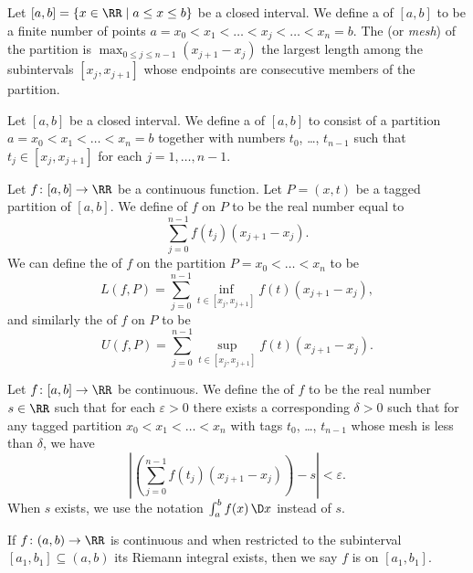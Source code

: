 \begin{node}\label{calculus:integral-0003}%

\begin{definition}\label{calculus:integral-0004}%
Let $[a,b]=\{x\in\RR\mid a\leq x\leq b\}$ be a closed interval.
We define a  of $[a,b]$ to be a finite number of
points $a=x_{0}<x_{1}<\dots<x_{j}<\dots<x_{n}=b$. The  (or
\emph{mesh}) of the partition is $\max_{0\leq j\leq n-1}(x_{j+1}-x_{j})$
the largest length among the subintervals $[x_{j}, x_{j+1}]$ whose
endpoints are consecutive members of the partition.
\end{definition}

\begin{definition}\label{calculus:integral-0005}%
Let $[a,b]$ be a closed interval.
We define a  of $[a,b]$ to consist of a
partition $a=x_{0}<x_{1}<\dots<x_{n}=b$ together with numbers $t_{0}$,
\dots, $t_{n-1}$ such that $t_{j}\in[x_{j},x_{j+1}]$ for each $j=1,\dots,n-1$.
\end{definition}

\begin{definition}\label{calculus:integral-0002}%
Let $f\colon[a,b]\to\RR$ be a continuous function. Let
$P=(x, t)$ be a tagged partition of $[a,b]$. We define 
 of $f$ on $P$ to be the real number equal to
\[\sum^{n-1}_{j=0}f(t_{j})(x_{j+1}-x_{j}).\]
We can define the  of $f$ on the partition
$P=x_{0}<\dots<x_{n}$ to be
\[L(f,P) =\sum^{n-1}_{j=0}\inf_{t\in[x_{j},x_{j+1}]}f(t)(x_{j+1}-x_{j}),\]
and similarly the  of $f$ on $P$ to be
\[U(f,P) =\sum^{n-1}_{j=0}\sup_{t\in[x_{j},x_{j+1}]}f(t)(x_{j+1}-x_{j}).\]
\end{definition}

\begin{definition}\label{calculus:integral-0006}%
Let $f\colon[a,b]\to\RR$ be continuous. We define the 
of $f$ to be the real number $s\in\RR$ such that for each
$\varepsilon>0$ there exists a corresponding $\delta>0$ such that for
any tagged partition $x_{0}<x_{1}<\dots<x_{n}$ with tags $t_{0}$, \dots, $t_{n-1}$
whose mesh is less than $\delta$, we have
\[\left|\left(\sum^{n-1}_{j=0}f(t_{j})(x_{j+1}-x_{j})\right)-s\right|<\varepsilon.\]
When $s$ exists, we use the notation $\int^{b}_{a}f(x)\,\D x$ instead of $s$.
\end{definition}

\begin{definition}\label{calculus:integral-000B}%
If $f\colon(a,b)\to\RR$ is continuous and when restricted to the
subinterval $[a_{1},b_{1}]\subseteq(a,b)$ its Riemann integral exists,
then we say $f$ is  on $[a_{1},b_{1}]$.
\end{definition}


\end{node}
